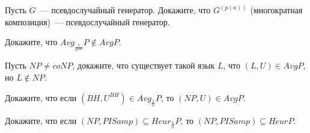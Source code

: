 \begin{task}
    Пусть $G$~--- псевдослучайный генератор. Докажите, что $G^{(p(n))}$ (многократная
    композиция)~--- псевдослучайный генератор.
\end{task}

\begin{task}
    Докажите, что $Avg_{\frac{1}{n^{100}}}P \notin AvgP$.
\end{task}

\begin{task}
    Пусть $NP \neq coNP$, докажите, что существует такой язык $L$, что $(L, U) \in
    AvgP$, но $L \notin NP$.
\end{task}

\begin{task}
    Докажите, что если $(BH, U^{BH}) \in Avg_{\frac{1}{n}}P$, то $(NP, U) \in AvgP$.
\end{task}

\begin{task}
    Докажите, что если $(NP, PISamp) \subseteq Heur_{\frac{1}{n}}P$, то $(NP, PISamp)
    \subseteq HeurP$.
\end{task}

